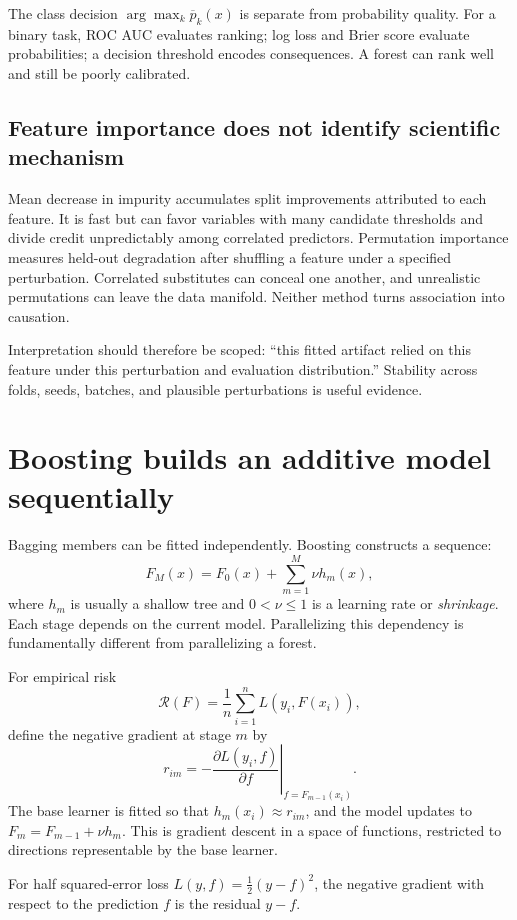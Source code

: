 The class decision $\arg\max_k\overline p_k(x)$ is separate from probability
quality. For a binary task, ROC AUC evaluates ranking; log loss and Brier score
evaluate probabilities; a decision threshold encodes consequences. A forest
can rank well and still be poorly calibrated.

\subsection{Feature importance does not identify scientific mechanism}

Mean decrease in impurity accumulates split improvements attributed to each
feature. It is fast but can favor variables with many candidate thresholds and
divide credit unpredictably among correlated predictors. Permutation importance
measures held-out degradation after shuffling a feature under a specified
perturbation. Correlated substitutes can conceal one another, and unrealistic
permutations can leave the data manifold. Neither method turns association into
causation.

Interpretation should therefore be scoped: ``this fitted artifact relied on
this feature under this perturbation and evaluation distribution.'' Stability
across folds, seeds, batches, and plausible perturbations is useful evidence.

\section{Boosting builds an additive model sequentially}

Bagging members can be fitted independently. Boosting constructs a sequence:
\[
  F_M(x)=F_0(x)+\sum_{m=1}^{M}\nu h_m(x),
\]
where $h_m$ is usually a shallow tree and $0<\nu\le1$ is a learning rate or
\emph{shrinkage}. Each stage depends on the current model. Parallelizing this
dependency is fundamentally different from parallelizing a forest.

For empirical risk
\[
  \mathcal R(F)=\frac1n\sum_{i=1}^{n}L(y_i,F(x_i)),
\]
define the negative gradient at stage $m$ by
\[
  r_{im}=-\left.
  \frac{\partial L(y_i,f)}{\partial f}
  \right|_{f=F_{m-1}(x_i)}.
\]
The base learner is fitted so that $h_m(x_i)\approx r_{im}$, and the model
updates to $F_m=F_{m-1}+\nu h_m$. This is gradient descent in a space of
functions, restricted to directions representable by the base learner.

\begin{theorem}
For half squared-error loss
$L(y,f)=\tfrac12(y-f)^2$, the negative gradient with respect to the prediction
$f$ is the residual $y-f$.
\end{theorem}

